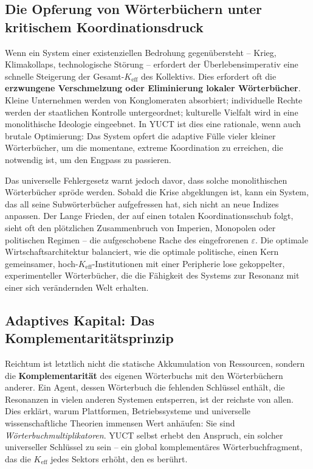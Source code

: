 \documentclass[12pt,a4paper]{article}
\newcommand{\Keff}{K_{\mathrm{eff}}}
\begin{document}
\subsection{Die Opferung von Wörterbüchern unter kritischem Koordinationsdruck}

Wenn ein System einer existenziellen Bedrohung gegenübersteht – Krieg, Klimakollaps, technologische Störung – erfordert der Überlebensimperativ eine schnelle Steigerung der Gesamt-\(\Keff\) des Kollektivs. Dies erfordert oft die \textbf{erzwungene Verschmelzung oder Eliminierung lokaler Wörterbücher}. Kleine Unternehmen werden von Konglomeraten absorbiert; individuelle Rechte werden der staatlichen Kontrolle untergeordnet; kulturelle Vielfalt wird in eine monolithische Ideologie eingeebnet. In YUCT ist dies eine rationale, wenn auch brutale Optimierung: Das System opfert die adaptive Fülle vieler kleiner Wörterbücher, um die momentane, extreme Koordination zu erreichen, die notwendig ist, um den Engpass zu passieren.

Das universelle Fehlergesetz warnt jedoch davor, dass solche monolithischen Wörterbücher spröde werden. Sobald die Krise abgeklungen ist, kann ein System, das all seine Subwörterbücher aufgefressen hat, sich nicht an neue Indizes anpassen. Der Lange Frieden, der auf einen totalen Koordinationsschub folgt, sieht oft den plötzlichen Zusammenbruch von Imperien, Monopolen oder politischen Regimen – die aufgeschobene Rache des eingefrorenen \(\varepsilon\). Die optimale Wirtschaftsarchitektur balanciert, wie die optimale politische, einen Kern gemeinsamer, hoch-\(\Keff\)-Institutionen mit einer Peripherie lose gekoppelter, experimenteller Wörterbücher, die die Fähigkeit des Systems zur Resonanz mit einer sich verändernden Welt erhalten.

\subsection{Adaptives Kapital: Das Komplementaritätsprinzip}

Reichtum ist letztlich nicht die statische Akkumulation von Ressourcen, sondern die \textbf{Komplementarität} des eigenen Wörterbuchs mit den Wörterbüchern anderer. Ein Agent, dessen Wörterbuch die fehlenden Schlüssel enthält, die Resonanzen in vielen anderen Systemen entsperren, ist der reichste von allen. Dies erklärt, warum Plattformen, Betriebssysteme und universelle wissenschaftliche Theorien immensen Wert anhäufen: Sie sind \emph{Wörterbuchmultiplikatoren}. YUCT selbst erhebt den Anspruch, ein solcher universeller Schlüssel zu sein – ein global komplementäres Wörterbuchfragment, das die \(\Keff\) jedes Sektors erhöht, den es berührt.
\end{document}
